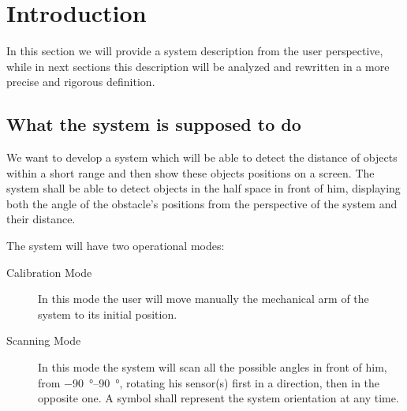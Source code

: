 \newcommand{\sonar}[1][]{%
\ifthenelse{\equal{#1}{}}{{\em sonar}}{{\em #1 sonar}}%
}



\newcommand{\wmodeact}[4]{%
\begin{itemize}%
    \item \textbf{Pre-condition}: \ifthenelse{\equal{#1}{}}{--}{#1}%
    \item \textbf{Input sequence}: \ifthenelse{\equal{#2}{}}{--}{#2}%
    \item \textbf{Ouput sequence}: \ifthenelse{\equal{#3}{}}{--}{#3}%
    \item \textbf{Post-condition}: \ifthenelse{\equal{#4}{}}{--}{#4}%
\end{itemize}%
}















\chapter{Introduction}

In this section we will provide a system description from the user perspective, while in next sections this description will be analyzed and rewritten in a more precise and rigorous definition.

\section{What the system is supposed to do}

We want to develop a system which will be able to detect the distance of objects within a short range and then show these objects positions on a screen. The system shall be able to detect objects in the half space in front of him, displaying both the angle of the obstacle's positions from the perspective of the system and their distance.

The system will have two operational modes:
\begin{description}
    \item[Calibration Mode] In this mode the user will move manually the mechanical arm of the system to its initial position. 
    \item[Scanning Mode] In this mode the system will scan all the possible angles in front of him, from \SIrange[retain-explicit-plus]{-90}{+90}{\degree}, rotating his sensor(s) first in a direction, then in the opposite one. A symbol shall represent the system orientation at any time.
\end{description}

